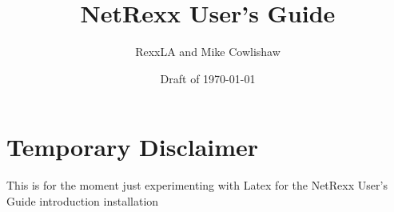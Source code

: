 \documentclass[12pt]{book}
\begin{document}
        
\setcounter{tocdepth}{1} 
\title{NetRexx User's Guide}
\author{RexxLA and Mike Cowlishaw}
\date{Draft of \today}
\maketitle
{}
\pagestyle{plain}
\frontmatter
{}
\pagestyle{plain}
\large
\section*{Temporary Disclaimer}
This is for the moment just experimenting with Latex for the NetRexx
User's Guide
\newpage
\large
\tableofcontents
\newpage
{}
\large
\frontmatter
 {introduction}
\mainmatter
 {installation}


\backmatter
\listoffigures
\listoftables
\printindex
\end{document}
